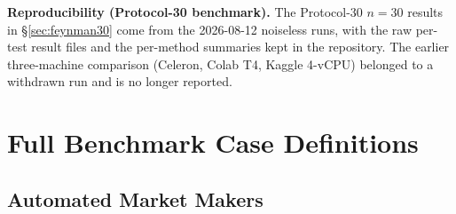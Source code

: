 \documentclass[twoside,11pt]{article}
\begin{document}
\textbf{Reproducibility (Protocol-30 benchmark).} The Protocol-30 $n=30$ results in
\S\ref{sec:feynman30} come from the 2026-08-12 noiseless runs, with the raw
per-test result files and the per-method summaries kept in the repository.
The earlier three-machine comparison (Celeron, Colab T4, Kaggle 4-vCPU) belonged
to a withdrawn run and is no longer reported.




\appendix

\section{Full Benchmark Case Definitions}\label{sec:benchmark_cases}
\label{app:cases}

\subsection{Automated Market Makers}\label{subsec:automated-market-makers}
\label{sec:bench_amm}
\end{document}
